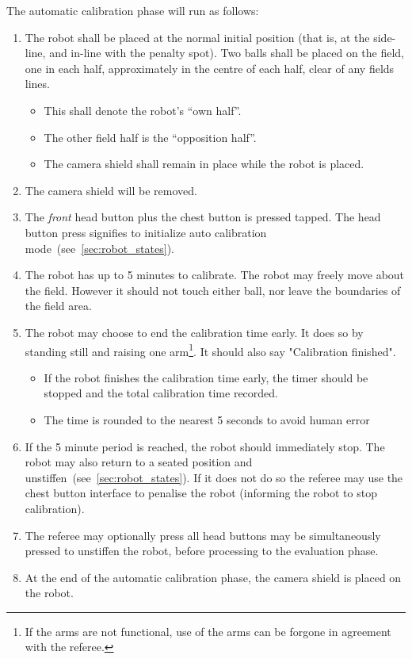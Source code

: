 The automatic calibration phase will run as follows:
\begin{enumerate}
    \item The robot shall be placed at the normal initial position (that is, at the side-line, and in-line with the penalty spot). Two balls shall be placed on the field, one in each half, approximately in the centre of each half, clear of any fields lines.
    \begin{itemize}
        \item This shall denote the robot's  ``own half''.
        \item The other field half is the ``opposition half''.
        \item The camera shield shall remain in place while the robot is placed.
    \end{itemize} 
    \item The camera shield will be removed.
    \item The \textit{front} head button plus the chest button is pressed tapped. The head button press signifies to initialize auto calibration mode~(see~\ref{sec:robot_states}).
    \item The robot has up to 5 minutes to calibrate. The robot may freely move about the field. However it should not touch either ball, nor leave the boundaries of the field area.
    \item The robot may choose to end the calibration time early. It does so by standing still and raising one arm\footnote{If the arms are not functional, use of the arms can be forgone in agreement with the referee.}. It should also say "Calibration finished".
    \begin{itemize}
        \item If the robot finishes the calibration time early, the timer should be stopped and the total calibration time recorded.
        \item The time is rounded to the nearest 5 seconds to avoid human error
    \end{itemize} 
    \item If the 5 minute period is reached, the robot should immediately stop. The robot may also return to a seated position and unstiffen~(see~\ref{sec:robot_states}). If it does not do so the referee may use the chest button interface to penalise the robot (informing the robot to stop calibration). 
    \item The referee may optionally press all head buttons may be simultaneously pressed to unstiffen the robot, before processing to the evaluation phase.
    \item At the end of the automatic calibration phase, the camera shield is placed on the robot.
\end{enumerate} 

